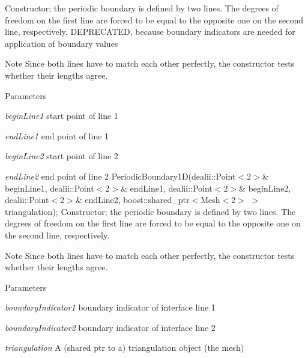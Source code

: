 Constructor; the periodic boundary is defined by two lines. The degrees of freedom on the first line are forced to be equal to the opposite one on the second line, respectively. DEPRECATED, because boundary indicators are needed for application of boundary values \begin{DoxyNote}{Note}
Since both lines have to match each other perfectly, the constructor tests whether their lengths agree.
\end{DoxyNote}

\begin{DoxyParams}{Parameters}
\item[{\em beginLine1}]start point of line 1 \item[{\em endLine1}]end point of line 1 \item[{\em beginLine2}]start point of line 2 \item[{\em endLine2}]end point of line 2 PeriodicBoundary1D(dealii::Point$<$2$>$\& beginLine1, dealii::Point$<$2$>$\& endLine1, dealii::Point$<$2$>$\& beginLine2, dealii::Point$<$2$>$\& endLine2, boost::shared\_\-ptr$<$Mesh$<$2$>$ $>$ triangulation); Constructor; the periodic boundary is defined by two lines. The degrees of freedom on the first line are forced to be equal to the opposite one on the second line, respectively. \end{DoxyParams}
\begin{DoxyNote}{Note}
Since both lines have to match each other perfectly, the constructor tests whether their lengths agree.
\end{DoxyNote}

\begin{DoxyParams}{Parameters}
\item[{\em boundaryIndicator1}]boundary indicator of interface line 1 \item[{\em boundaryIndicator2}]boundary indicator of interface line 2 \item[{\em triangulation}]A (shared ptr to a) triangulation object (the mesh) \end{DoxyParams}


